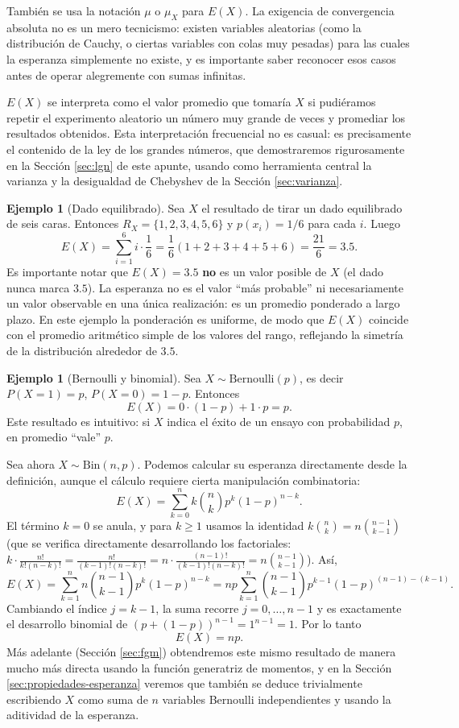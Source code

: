 \documentclass[11pt,a4paper]{article}
\theoremstyle{plain}
\theoremstyle{definition}
\newtheorem{ejemplo}[teorema]{Ejemplo}
\theoremstyle{remark}
\begin{document}
También se usa la notación $\mu$ o $\mu_X$ para $E(X)$. La exigencia de convergencia absoluta no es un mero tecnicismo: existen variables aleatorias (como la distribución de Cauchy, o ciertas variables con colas muy pesadas) para las cuales la esperanza simplemente no existe, y es importante saber reconocer esos casos antes de operar alegremente con sumas infinitas.

$E(X)$ se interpreta como el valor promedio que tomaría $X$ si pudiéramos repetir el experimento aleatorio un número muy grande de veces y promediar los resultados obtenidos. Esta interpretación frecuencial no es casual: es precisamente el contenido de la ley de los grandes números, que demostraremos rigurosamente en la Sección \ref{sec:lgn} de este apunte, usando como herramienta central la varianza y la desigualdad de Chebyshev de la Sección \ref{sec:varianza}.

\begin{ejemplo}[Dado equilibrado]
Sea $X$ el resultado de tirar un dado equilibrado de seis caras. Entonces $R_X=\{1,2,3,4,5,6\}$ y $p(x_i)=1/6$ para cada $i$. Luego
\[
E(X) = \sum_{i=1}^{6} i\cdot\frac16 = \frac16(1+2+3+4+5+6) = \frac{21}{6} = 3.5.
\]
Es importante notar que $E(X)=3.5$ \textbf{no} es un valor posible de $X$ (el dado nunca marca $3.5$). La esperanza no es el valor ``más probable'' ni necesariamente un valor observable en una única realización: es un promedio ponderado a largo plazo. En este ejemplo la ponderación es uniforme, de modo que $E(X)$ coincide con el promedio aritmético simple de los valores del rango, reflejando la simetría de la distribución alrededor de $3.5$.
\end{ejemplo}

\begin{ejemplo}[Bernoulli y binomial]
Sea $X\sim\text{Bernoulli}(p)$, es decir $P(X=1)=p$, $P(X=0)=1-p$. Entonces
\[
E(X) = 0\cdot(1-p) + 1\cdot p = p.
\]
Este resultado es intuitivo: si $X$ indica el éxito de un ensayo con probabilidad $p$, en promedio ``vale'' $p$.

Sea ahora $X\sim\text{Bin}(n,p)$. Podemos calcular su esperanza directamente desde la definición, aunque el cálculo requiere cierta manipulación combinatoria:
\[
E(X) = \sum_{k=0}^n k\binom{n}{k}p^k(1-p)^{n-k}.
\]
El término $k=0$ se anula, y para $k\geq 1$ usamos la identidad $k\binom{n}{k}=n\binom{n-1}{k-1}$ (que se verifica directamente desarrollando los factoriales: $k\cdot\frac{n!}{k!(n-k)!} = \frac{n!}{(k-1)!(n-k)!} = n\cdot\frac{(n-1)!}{(k-1)!(n-k)!} = n\binom{n-1}{k-1}$). Así,
\[
E(X) = \sum_{k=1}^n n\binom{n-1}{k-1}p^k(1-p)^{n-k} = np\sum_{k=1}^n \binom{n-1}{k-1}p^{k-1}(1-p)^{(n-1)-(k-1)}.
\]
Cambiando el índice $j=k-1$, la suma recorre $j=0,\dots,n-1$ y es exactamente el desarrollo binomial de $(p+(1-p))^{n-1}=1^{n-1}=1$. Por lo tanto
\[
E(X) = np.
\]
Más adelante (Sección \ref{sec:fgm}) obtendremos este mismo resultado de manera mucho más directa usando la función generatriz de momentos, y en la Sección \ref{sec:propiedades-esperanza} veremos que también se deduce trivialmente escribiendo $X$ como suma de $n$ variables Bernoulli independientes y usando la aditividad de la esperanza.
\end{ejemplo}
\end{document}
